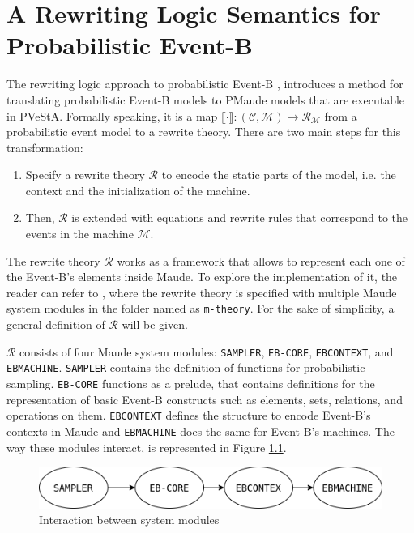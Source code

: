 \chapter{A Rewriting Logic Semantics for Probabilistic Event-B}
The rewriting logic approach to probabilistic Event-B \cite{Olarte}, introduces a method for translating probabilistic Event-B models to PMaude models that are executable in PVeStA. Formally speaking, it is a map $\llbracket \cdot \rrbracket: (\mathscr{C}, \mathscr{M}) \rightarrow \mathscr{R}_\mathscr{M}$ from a probabilistic event model to a rewrite theory. There are two main steps for this transformation:

\begin{enumerate}
    \item Specify a rewrite theory $\mathscr{R}$ to encode the static parts of the model, i.e. the context and the initialization of the machine.
    \item Then, $\mathscr{R}$ is extended with equations and rewrite rules that correspond to the events in the machine $\mathscr{M}$.
\end{enumerate}

The rewrite theory $\mathscr{R}$ works as a framework that allows to represent each one of the Event-B's elements inside Maude. To explore the implementation of it, the reader can refer to \cite{tool.website}, where the rewrite theory is specified with multiple Maude system modules in the folder named as \texttt{m-theory}. For the sake of simplicity, a general definition of $\mathscr{R}$ will be given.

$\mathscr{R}$ consists of four Maude system modules: \texttt{SAMPLER}, \texttt{EB-CORE}, \texttt{EBCONTEXT}, and \texttt{EBMACHINE}. \texttt{SAMPLER} contains the definition of functions for probabilistic sampling. \texttt{EB-CORE} functions as a prelude, that contains definitions for the representation of basic Event-B constructs such as elements, sets, relations, and operations on them. \texttt{EBCONTEXT} defines the structure to encode Event-B's contexts in Maude and \texttt{EBMACHINE} does the same for Event-B's machines. The way these modules interact, is represented in Figure \ref{fig:E2M1}. 

\begin{figure}[h]
    \centering
    \includegraphics[scale = 0.5]{images/E2M1.png}
    \caption{Interaction between system modules}
    \label{fig:E2M1}
\end{figure}

